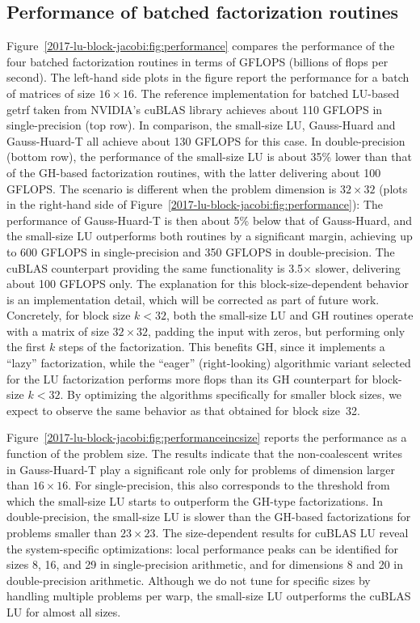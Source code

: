 \subsection{Performance of batched factorization routines}

Figure~\ref{2017-lu-block-jacobi:fig:performance} compares the performance of the four
batched factorization routines in terms of GFLOPS (billions of flops per 
second).
The left-hand side plots in the figure report the performance
for a batch of matrices of size $16\times16$. 
The reference implementation for batched LU-based {\sc getrf} taken from NVIDIA's
cuBLAS library achieves about 110 GFLOPS in single-precision (top row).
In comparison, the small-size LU, Gauss-Huard and Gauss-Huard-T
all achieve about 130 GFLOPS for this case. In double-precision (bottom row), the performance
of the small-size LU is about 35\% lower than that of the GH-based
factorization routines, with the latter delivering about 100 GFLOPS. 
The scenario is different when the problem dimension is $32\times32$ (plots in the right-hand side of Figure~\ref{2017-lu-block-jacobi:fig:performance}):
The performance of Gauss-Huard-T is then about 5\% below that of Gauss-Huard,
and the small-size LU outperforms both routines by a significant margin, achieving up to
600 GFLOPS in single-precision and 350 GFLOPS in double-precision.
The cuBLAS counterpart providing the same functionality is 3.5$\times$ slower, delivering about 100 GFLOPS only.
The explanation for this block-size-dependent behavior
is an implementation detail, which will be corrected as part of future work.
Concretely, for block size $k < 32$, both the small-size LU and GH routines
operate with a matrix of size $32 \times 32$, padding the input with
zeros, but performing only the first $k$ steps of the factorization.
This benefits GH,
since it implements a ``lazy'' factorization,
while the ``eager'' (right-looking) algorithmic variant
selected for the LU factorization 
performs more flops than its GH counterpart for block-size $k<32$.
By optimizing the algorithms specifically for smaller block sizes,
we expect to observe the same behavior as that obtained for block size~32.

Figure~\ref{2017-lu-block-jacobi:fig:performanceincsize} reports the performance as a function of the problem size.
The results indicate that the non-coalescent writes in Gauss-Huard-T play a significant role only for 
problems of dimension larger than $16\times16$. For single-precision, 
this also corresponds  to the threshold from which
the small-size LU starts to outperform the GH-type factorizations. 
In double-precision, the small-size LU is slower than the GH-based factorizations
for problems smaller than $23\times23$.
The size-dependent results for cuBLAS LU reveal the system-specific optimizations:
local performance peaks can be identified for sizes 8, 16, and 
29 in single-precision arithmetic,
and for dimensions 8 and 20 in double-precision arithmetic. 
Although we do not tune for specific sizes by handling multiple problems per warp,
the small-size LU outperforms the cuBLAS LU for almost all sizes.


